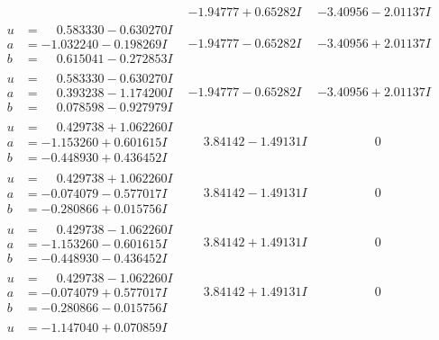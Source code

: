 \documentclass[1p]{elsarticle_modified}
\theoremstyle{definition}
\begin{document}
$$\begin{array}{c|c|c}
 & -1.94777 + 0.65282 I & -3.40956 - 2.01137 I \\ \hline\begin{aligned}
u &= \phantom{-}0.583330 - 0.630270 I \\
a &= -1.032240 - 0.198269 I \\
b &= \phantom{-}0.615041 - 0.272853 I\end{aligned}
 & -1.94777 - 0.65282 I & -3.40956 + 2.01137 I \\ \hline\begin{aligned}
u &= \phantom{-}0.583330 - 0.630270 I \\
a &= \phantom{-}0.393238 - 1.174200 I \\
b &= \phantom{-}0.078598 - 0.927979 I\end{aligned}
 & -1.94777 - 0.65282 I & -3.40956 + 2.01137 I \\ \hline\begin{aligned}
u &= \phantom{-}0.429738 + 1.062260 I \\
a &= -1.153260 + 0.601615 I \\
b &= -0.448930 + 0.436452 I\end{aligned}
 & \phantom{-}3.84142 - 1.49131 I & \phantom{-0.000000 } 0 \\ \hline\begin{aligned}
u &= \phantom{-}0.429738 + 1.062260 I \\
a &= -0.074079 - 0.577017 I \\
b &= -0.280866 + 0.015756 I\end{aligned}
 & \phantom{-}3.84142 - 1.49131 I & \phantom{-0.000000 } 0 \\ \hline\begin{aligned}
u &= \phantom{-}0.429738 - 1.062260 I \\
a &= -1.153260 - 0.601615 I \\
b &= -0.448930 - 0.436452 I\end{aligned}
 & \phantom{-}3.84142 + 1.49131 I & \phantom{-0.000000 } 0 \\ \hline\begin{aligned}
u &= \phantom{-}0.429738 - 1.062260 I \\
a &= -0.074079 + 0.577017 I \\
b &= -0.280866 - 0.015756 I\end{aligned}
 & \phantom{-}3.84142 + 1.49131 I & \phantom{-0.000000 } 0 \\ \hline\begin{aligned}
u &= -1.147040 + 0.070859 I \\

\end{aligned}
\end{array}$$
\end{document}
